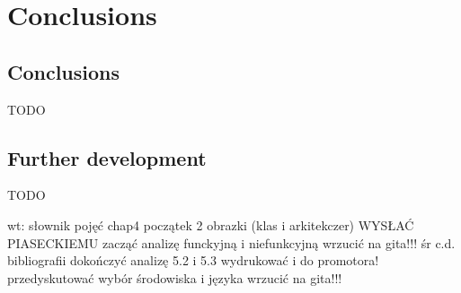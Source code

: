\chapter{Conclusions}

\section{Conclusions}

TODO

\section{Further development}

TODO




wt:
    słownik pojęć
    chap4 początek
    2 obrazki (klas i arkitekczer)
        WYSŁAĆ PIASECKIEMU
    zacząć analizę funckyjną i niefunkcyjną
    wrzucić na gita!!!
śr
    c.d. bibliografii
    dokończyć analizę
    5.2 i 5.3
    wydrukować i do promotora!
    przedyskutować wybór środowiska i języka
    wrzucić na gita!!!